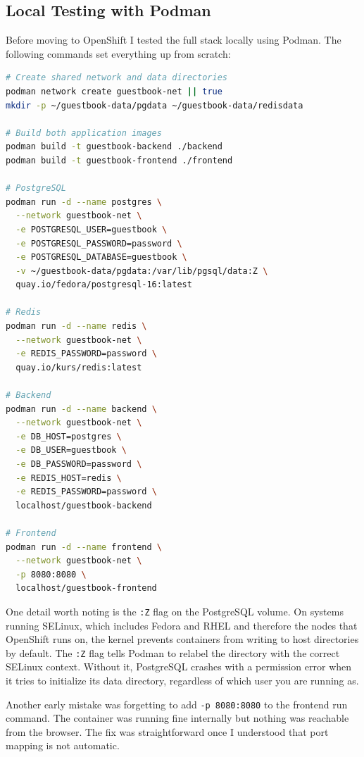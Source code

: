\subsection{Local Testing with Podman}

Before moving to OpenShift I tested the full stack locally using Podman. The following
commands set everything up from scratch:

\begin{lstlisting}[language=bash]
# Create shared network and data directories
podman network create guestbook-net || true
mkdir -p ~/guestbook-data/pgdata ~/guestbook-data/redisdata

# Build both application images
podman build -t guestbook-backend ./backend
podman build -t guestbook-frontend ./frontend

# PostgreSQL
podman run -d --name postgres \
  --network guestbook-net \
  -e POSTGRESQL_USER=guestbook \
  -e POSTGRESQL_PASSWORD=password \
  -e POSTGRESQL_DATABASE=guestbook \
  -v ~/guestbook-data/pgdata:/var/lib/pgsql/data:Z \
  quay.io/fedora/postgresql-16:latest

# Redis
podman run -d --name redis \
  --network guestbook-net \
  -e REDIS_PASSWORD=password \
  quay.io/kurs/redis:latest

# Backend
podman run -d --name backend \
  --network guestbook-net \
  -e DB_HOST=postgres \
  -e DB_USER=guestbook \
  -e DB_PASSWORD=password \
  -e REDIS_HOST=redis \
  -e REDIS_PASSWORD=password \
  localhost/guestbook-backend

# Frontend
podman run -d --name frontend \
  --network guestbook-net \
  -p 8080:8080 \
  localhost/guestbook-frontend
\end{lstlisting}

One detail worth noting is the \texttt{:Z} flag on the PostgreSQL volume. On systems
running SELinux, which includes Fedora and RHEL and therefore the nodes that OpenShift
runs on, the kernel prevents containers from writing to host directories by default.
The \texttt{:Z} flag tells Podman to relabel the directory with the correct SELinux
context. Without it, PostgreSQL crashes with a permission error when it tries to
initialize its data directory, regardless of which user you are running as.

Another early mistake was forgetting to add \texttt{-p 8080:8080} to the frontend run
command. The container was running fine internally but nothing was reachable from the
browser. The fix was straightforward once I understood that port mapping is not automatic.

